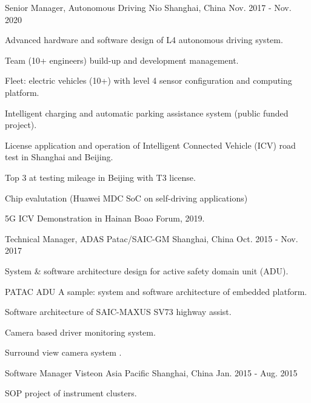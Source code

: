 \documentclass[../cv.tex]{subfiles}
\begin{document}
\begin{cventries}
  \cventry
    {Senior Manager, Autonomous Driving} %
    {Nio} %
    {Shanghai, China} %
    {Nov. 2017 - Nov. 2020} %
    {
      \begin{cvitems}
        \item Advanced hardware and software design of L4 autonomous driving system.
        \item Team (10+ engineers) build-up and development management.
        \item Fleet: electric vehicles (10+) with level 4 sensor configuration and computing platform.
        \item Intelligent charging and automatic parking assistance system (public funded project).
        \item License application and operation of Intelligent Connected Vehicle (ICV) road test in Shanghai and Beijing.
        \item Top 3 at testing mileage in Beijing with T3 license.
        \item Chip evalutation (Huawei MDC SoC on self-driving applications)
        \item 5G ICV Demonstration in Hainan Boao Forum, 2019.
      \end{cvitems}
    }

  \cventry
    {Technical Manager, ADAS} %
    {Patac/SAIC-GM} %
    {Shanghai, China} %
    {Oct. 2015 - Nov. 2017} %
    {
      \begin{cvitems}
        \item System \& software architecture design for active safety domain unit (ADU).
        \item PATAC ADU A sample: system and software architecture of embedded platform.
        \item Software architecture of SAIC-MAXUS SV73 highway assist.
        \item Camera based driver monitoring system.
        \item Surround view camera system \supercite{Xin_RearView_17}.
      \end{cvitems}
    }


  \cventry
    {Software Manager} %
    {Visteon Asia Pacific} %
    {Shanghai, China} %
    {Jan. 2015 - Aug. 2015} %
    {
      \begin{cvitems}
        \item SOP project of instrument clusters.
      \end{cvitems}
    }


\end{cventries}
\end{document}
